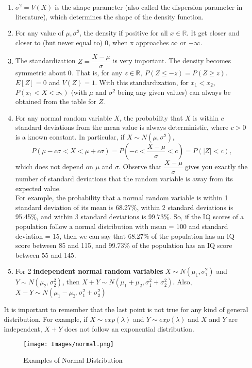 \begin{enumerate}
    \item $\sigma^2 = V(X)$ is the shape parameter (also called the dispersion parameter in literature), which determines the shape of the density function.
    \item For any value of $\mu, \sigma^2$, the density if positive for all $x \in \mathbb{R}$. It get closer and closer to (but never equal to) 0, when x approaches $\infty$ or $-\infty$.
    \item The standardization $Z = \dfrac{X - \mu}{\sigma}$ is very important. The density becomes symmetric about 0. That is, for any $z \in \mathbb{R}, \ P(Z \leq -z) = P(Z \geq z)$. $E[Z] = 0$ and $V(Z) = 1$. With this standardization, for $x_1 < x_2$, $P(x_1 < X < x_2)$ (with $\mu$ and $\sigma^2$ being any given values) can always be obtained from the table for $Z$.
    \item For any normal random variable $X$, the probability that $X$ is within $c$ standard deviations from the mean value is always deterministic, where $c > 0$ is a known constant. In particular, if $X \sim N(\mu, \sigma^2)$, 
    $$
    P(\mu - c\sigma < X < \mu + c\sigma) = P(-c < \dfrac{X - \mu}{\sigma} < c) = P(|Z| < c),
    $$ which does not depend on $\mu$ and $\sigma$. Observe that $\dfrac{X - \mu}{\sigma}$ gives you exactly the number of standard deviations that the random variable is away from its expected value.\\
    For example, the probability that a normal random variable is within 1 standard deviation of its mean is 68.27\%, within 2 standard deviations is 95.45\%, and within 3 standard deviations is 99.73\%. So, if the IQ scores of a population follow a normal distribution with mean = 100 and standard deviation = 15, then we can say that 68.27\% of the population has an IQ score between 85 and 115, and 99.73\% of the population has an IQ score between 55 and 145.
    \item For 2 \textbf{independent normal random variables} $X \sim N(\mu_1, \sigma_{1}^2)$ and $Y \sim N(\mu_2, \sigma_{2}^2)$, then $X + Y \sim N(\mu_1 + \mu_2, \sigma_{1}^2 + \sigma_{2}^2)$. Also, $X - Y \sim N(\mu_1 - \mu_2, \sigma_{1}^2 + \sigma_{2}^2)$
\end{enumerate}
\begin{note}
\end{note}
It is important to remember that the last point is not true for any kind of general distribution. For example, if $X \sim exp(\lambda)$ and $Y \sim exp(\lambda)$ and $X$ and $Y$ are independent, $X + Y$ does not follow an exponential distribution.
\begin{figure}[ht]
    \centering
    \texttt{[image: Images/normal.png]}
    \caption{Examples of Normal Distribution}
    \label{fig:my_label}
\end{figure}
